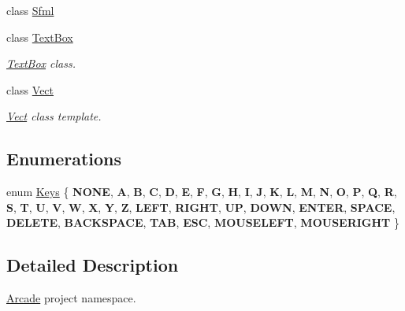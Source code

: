 \begin{DoxyCompactItemize}
\item 
class \hyperlink{class_arcade_1_1_sfml}{Sfml}
\item 
class \hyperlink{class_arcade_1_1_text_box}{Text\+Box}
\begin{DoxyCompactList}\small\item\em \hyperlink{class_arcade_1_1_text_box}{Text\+Box} class. \end{DoxyCompactList}\item 
class \hyperlink{class_arcade_1_1_vect}{Vect}
\begin{DoxyCompactList}\small\item\em \hyperlink{class_arcade_1_1_vect}{Vect} class template. \end{DoxyCompactList}\end{DoxyCompactItemize}
\subsection*{Enumerations}
\begin{DoxyCompactItemize}
\item 
enum \hyperlink{namespace_arcade_a9b501908b20bc993e4f8226db5323c41}{Keys} \{ \newline
{\bfseries N\+O\+NE}, 
{\bfseries A}, 
{\bfseries B}, 
{\bfseries C}, 
\newline
{\bfseries D}, 
{\bfseries E}, 
{\bfseries F}, 
{\bfseries G}, 
\newline
{\bfseries H}, 
{\bfseries I}, 
{\bfseries J}, 
{\bfseries K}, 
\newline
{\bfseries L}, 
{\bfseries M}, 
{\bfseries N}, 
{\bfseries O}, 
\newline
{\bfseries P}, 
{\bfseries Q}, 
{\bfseries R}, 
{\bfseries S}, 
\newline
{\bfseries T}, 
{\bfseries U}, 
{\bfseries V}, 
{\bfseries W}, 
\newline
{\bfseries X}, 
{\bfseries Y}, 
{\bfseries Z}, 
{\bfseries L\+E\+FT}, 
\newline
{\bfseries R\+I\+G\+HT}, 
{\bfseries UP}, 
{\bfseries D\+O\+WN}, 
{\bfseries E\+N\+T\+ER}, 
\newline
{\bfseries S\+P\+A\+CE}, 
{\bfseries D\+E\+L\+E\+TE}, 
{\bfseries B\+A\+C\+K\+S\+P\+A\+CE}, 
{\bfseries T\+AB}, 
\newline
{\bfseries E\+SC}, 
{\bfseries M\+O\+U\+S\+E\+L\+E\+FT}, 
{\bfseries M\+O\+U\+S\+E\+R\+I\+G\+HT}
 \}
\end{DoxyCompactItemize}


\subsection{Detailed Description}
\hyperlink{namespace_arcade}{Arcade} project namespace. 

